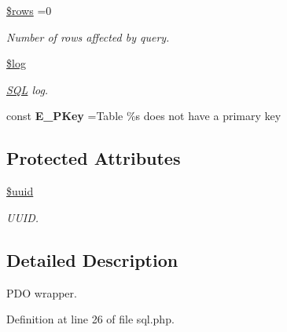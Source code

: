 \begin{DoxyCompactItemize}
\hypertarget{class_d_b_1_1_s_q_l_ace2ec39e7df3899fa8df9640ec274b03}{}\label{class_d_b_1_1_s_q_l_ace2ec39e7df3899fa8df9640ec274b03} 
\hyperlink{class_d_b_1_1_s_q_l_ace2ec39e7df3899fa8df9640ec274b03}{\$rows} =0
\begin{DoxyCompactList}\small\item\em Number of rows affected by query. \end{DoxyCompactList}\item 
\hypertarget{class_d_b_1_1_s_q_l_a9a2cf15a653aee8be437f7ae474cd494}{}\label{class_d_b_1_1_s_q_l_a9a2cf15a653aee8be437f7ae474cd494} 
\hyperlink{class_d_b_1_1_s_q_l_a9a2cf15a653aee8be437f7ae474cd494}{\$log}
\begin{DoxyCompactList}\small\item\em \hyperlink{class_d_b_1_1_s_q_l}{S\+QL} log. \end{DoxyCompactList}\end{DoxyCompactItemize}
{\bf }\par
\begin{DoxyCompactItemize}
\item 
\hypertarget{class_d_b_1_1_s_q_l_a11f97c3c297f2a5a6ed6fd92b78c8a74}{}\label{class_d_b_1_1_s_q_l_a11f97c3c297f2a5a6ed6fd92b78c8a74} 
const {\bfseries E\+\_\+\+P\+Key} =\textquotesingle{}Table \%s does not have a primary key\textquotesingle{}
\end{DoxyCompactItemize}

\subsection*{Protected Attributes}
\begin{DoxyCompactItemize}
\item 
\hypertarget{class_d_b_1_1_s_q_l_aeccc2a337445686487ea085278c79eff}{}\label{class_d_b_1_1_s_q_l_aeccc2a337445686487ea085278c79eff} 
\hyperlink{class_d_b_1_1_s_q_l_aeccc2a337445686487ea085278c79eff}{\$uuid}
\begin{DoxyCompactList}\small\item\em U\+U\+ID. \end{DoxyCompactList}\end{DoxyCompactItemize}


\subsection{Detailed Description}
P\+DO wrapper. 

Definition at line 26 of file sql.\+php.



